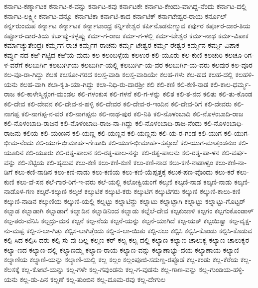 ಕರ್ನಾಟ-ಕರ್ಣ್ನಾಟಕ
ಕರ್ನಾಟ-ಕ-ವನ್ನು
ಕರ್ನಾಟ-ಕವು
ಕರ್ನಾಟಕೇ
ಕರ್ನಾಟ-ಕೇಂದು-ವಾಗಿದ್ದ-ನೆಂದು
ಕರ್ನಾಟ-ದಲ್ಲಿ
ಕರ್ನಾಟ-ಲಕ್ಷ್ಮೀ
ಕರ್ನಾಟ-ವನ್ನೂ
ಕರ್ನಾಟಿಕಾ
ಕರ್ನಾಟಿ-ಕಾದ
ಕರ್ನಾಟಿಕ್
ಕರ್ನಾಟೇಶ್ವರ-ರಾಯ
ಕರ್ನೂಲ್
ಕರ್ನ್ನರುಂಮಪ
ಕರ್ನ್ನಾಟ
ಕರ್ನ್ನಾಟಕ
ಕರ್ನ್ನಾಟಾಂಧ್ರ
ಕರ್ನ್ನಿಕೇಶ್ವರ
ಕರ್ಪಿನೊಡನುಣ್ಮುವ
ಕರ್ಪುರ
ಕರ್ಪೂರ-ದಾರ-ತಿಯ
ಕರ್ಪ್ಪೂರ-ದಾರ-ತಿಯ
ಕರ್ಬಪ್ಪು-ಕಳ್ಬಪ್ಪು
ಕರ್ಮ-ಗ-ರಾಜ
ಕರ್ಮ-ಗ-ಳಲ್ಲಿ
ಕರ್ಮ-ಟೇಶ್ವರ
ಕರ್ಮ-ನಾಥ
ಕರ್ಮ-ವಿಪಾಕ
ಕರ್ಮಾಚ್ಯುತೇಂದ್ರಃ
ಕರ್ಮ್ಮಗ-ರಾಚ
ಕರ್ಮ್ಮಗ-ರಾಚನು
ಕರ್ಮ್ಮ-ಟೇಶ್ವರ
ಕರ್ಮ್ಮ-ಠೇಶ್ವರ
ಕರ್ಮ್ಮನ
ಕರ್ಮ್ಮ-ವಿಪಾಕ
ಕರ್ವ್ವು-ನದ
ಕಱಿ-ಗಟ್ಟಿದ
ಕಱಿಯ-ಮದು
ಕಲ
ಕಲಂಬಳ್ಳೆಯ
ಕಲಉರ-ಕಲಿ-ಯೂರು
ಕಲ-ಕುಣಿ
ಕಲಚುರಿ
ಕಲಚೂ-ರಿಗ-ಳ-ವರೆಗೆ
ಕಲಬುರ್ಗಿ
ಕಲಬುರ್ಗಿಯ
ಕಲಬುರ್ಗಿ-ಯಲ್ಲಿ
ಕಲಬುರ್ಗಿ-ಯ-ವರ
ಕಲಬುರ್ಗಿ-ಯ-ವರು
ಕಲವುರ
ಕಲ-ವೂರ
ಕಲ-ವೂ-ರಾ-ಗಿದ್ದು
ಕಲಶ
ಕಲಸೋ-ಗರದ
ಕಲಸ್ತ-ವಾಡಿ
ಕಲಸ್ತ-ವಾಡಿಯೇ
ಕಲಹ-ಗಳು
ಕಲ-ಹದ
ಕಲಹ-ದಲ್ಲಿ
ಕಲಹಳಿ-ಯನು
ಕಲಹ-ವಾಗಿ
ಕಲಾ-ಕೃತಿ-ಯಾ-ಗಿದ್ದು
ಕಲಾ-ನಿಧಿ-ರು-ದಾರಶ್ರೀ
ಕಲಿ
ಕಲಿ-ಕಣಿ
ಕಲಿ-ಕಣಿ-ನಾಡ
ಕಲಿ-ಕಾಲ-ಧರ್ಮ್ಮ-ರಾಜ
ಕಲಿ-ಕಾಳೇಸ್ಮಿನ್ಗಂಗ-ಮಂಡಲ
ಕಲಿ-ಗಳಂಕುಸ
ಕಲಿ-ಗಳನೆ
ಕಲಿ-ಗ-ಳನ್ನು
ಕಲಿತ
ಕಲಿ-ತ-ನದ
ಕಲಿತು
ಕಲಿ-ತು-ಕೊಂಡ
ಕಲಿ-ದೇವ
ಕಲಿ-ದೇವನ
ಕಲಿ-ದೇವ-ನ-ಹಳ್ಳಿ
ಕಲಿ-ದೇವರ
ಕಲಿ-ದೇವ-ರ-ಇಂದಿನ
ಕಲಿ-ದೇವ-ರಿಗೆ
ಕಲಿ-ದೇವರು
ಕಲಿ-ನಾಗಪ್ಪ
ಕಲಿ-ನಾಗಪ್ಪ-ನ-ವರ
ಕಲಿ-ನಾಗಪ್ಪನು
ಕಲಿ-ನಾಥ-ಪುರ
ಕಲಿ-ನಿತಿ
ಕಲಿ-ನೊಳಂಬಾದಿ
ಕಲಿ-ನೊಳಂಬಾದಿ-ರಾಜ
ಕಲಿ-ನೊಳಂಬಾದಿ-ರಾಜನ
ಕಲಿ-ನೊಳಂಬಾದಿ-ರಾಜ-ನಾ-ಗಿದ್ದು
ಕಲಿ-ನೊಳಂಬಾದಿ-ರಾಜ-ನೆಂದು
ಕಲಿ-ನೊಳಂಬಾಧಿ-ರಾಜನು
ಕಲಿಯ
ಕಲಿ-ಯಂಣನ
ಕಲಿ-ಯಣ್ಣ
ಕಲಿ-ಯಣ್ಣನ
ಕಲಿ-ಯಣ್ಣನು
ಕಲಿ-ಯ-ರ-ಗಂಡ
ಕಲಿ-ಯುಗ
ಕಲಿ-ಯುಗ-ಭೀಮ-ನೆಂದು
ಕಲಿ-ಯುಗ-ಭೀಮಾರ್ಹ-ಗೇಹಾದಿ
ಕಲಿ-ಯುಗ-ಭೀಮಾರ್ಹ-ಸತ್ಫೂಜೆ
ಕಲಿ-ಯುಗ-ಮಾತ್ತಂಡನುಂ
ಕಲಿ-ಯೂರಿನ
ಕಲಿ-ಯೂರು
ಕಲಿ-ರತ್ನ-ಪಾಲನ
ಕಲಿ-ರತ್ನ-ಪಾಲ-ನನ್ನು
ಕಲಿ-ರತ್ನ-ಪಾಲನು
ಕಲಿ-ರತ್ನ-ಪಾ-ಳನ
ಕಲಿ-ವರ್ಷ-ವನ್ನು
ಕಲಿ-ಸೆಟ್ಟಿಯ
ಕಲಿ-ಹೃದುವ
ಕಲು-ಕಣಿ
ಕಲು-ಕಣಿ-ಕುಣಿ
ಕಲು-ಕಣಿ-ನಾಡ
ಕಲು-ಕಣಿ-ನಾಡಾಳ್ವಂ
ಕಲು-ಕಣಿ-ನಾ-ಡಿಗೆ
ಕಲು-ಕಣಿ-ನಾಡಿನ
ಕಲು-ಕಣಿ-ನಾಡು
ಕಲು-ಕಣಿಯ
ಕಲು-ಕಣಿ-ಯೆಪ್ಪತ್ತಕ್ಕೆ
ಕಲುಕ-ಪಣ-ವೊಂದು
ಕಲು-ಕರೆ
ಕಲು-ಕುಣಿ
ಕಲು-ವೆ-ಸನ
ಕಲೆ-ಗಾರ-ರಿಗೆ-ಇ-ವರು
ಕಲೆ-ಯಲ್ಲಿ
ಕಲೋಕ್ವಿಯಂಗೆ
ಕಲ್ಕಣಿ
ಕಲ್ಕಣಿ-ನಾಡ
ಕಲ್ಕಣಿ-ನಾಡು
ಕಲ್ಕಣಿ-ನಾಡೊಳ-ಗಣ
ಕಲ್ಕರೆ-ಕಲ್ಕುಣಿ
ಕಲ್ಕಱೆ
ಕಲ್ಕುಟಿಕ
ಕಲ್ಕುಟಿ-ಕರು
ಕಲ್ಕುಟಿಗ
ಕಲ್ಕುಟಿಗರು
ಕಲ್ಕುಣಿ
ಕಲ್ಕುಣಿ-ಕಾಲು-ಕಣಿ
ಕಲ್ಕುಣಿ-ನಾಡಿನ
ಕಲ್ಕುಣಿಯ
ಕಲ್ಕುಣಿ-ಯಲ್ಲಿ
ಕಲ್ನಟ್ಟು
ಕಲ್ನಾಟಿನ್ದು
ಕಲ್ನಾಟು
ಕಲ್ನಾಟ್ಟಾಗಿ
ಕಲ್ನಾಟ್ಟು
ಕಲ್ನಾಟ್ಟು-ಗೊಟ್ಟರ್
ಕಲ್ನಾಡ
ಕಲ್ನಾಡಾಗಿ
ಕಲ್ನಾಡಾಗೆ
ಕಲ್ನಾಡಿನ
ಕಲ್ನಾಡಿನಿಂದ
ಕಲ್ನಾಡು
ಕಲ್ನೆಲೆ-ದೇವ
ಕಲ್ಪಕುಜಾಳಿ
ಕಲ್ಪಗಂ
ಕಲ್ಪಗಂಕೊಂಡಾಳ್
ಕಲ್ಪ-ತರು-ವೆನಿಸಿ
ಕಲ್ಪದ್ರು-ಮನ
ಕಲ್ಪನೆ
ಕಲ್ಪ-ನೆಯ
ಕಲ್ಪನೆ-ಯನ್ನು
ಕಲ್ಪನೆ-ಯಾಗಿದೆ
ಕಲ್ಪ-ಯತ್
ಕಲ್ಪಯಿತ್ವಾ
ಕಲ್ಪ-ವೃಕ್ಷ-ನು-ಮಪ್ಪ
ಕಲ್ಪಿ-ಸ-ಲಾ-ಗಿತ್ತು
ಕಲ್ಪಿಸ-ಲಾಗಿತ್ತೆಂದು
ಕಲ್ಪಿ-ಸ-ಲಾ-ಯಿತು
ಕಲ್ಪಿ-ಸಲು
ಕಲ್ಪಿಸಿ
ಕಲ್ಪಿಸಿ-ಕೊಂಡು
ಕಲ್ಪಿಸಿ-ಕೊಡುವ
ಕಲ್ಪಿ-ಸಿದ
ಕಲ್ಪಿಸಿ-ದರು
ಕಲ್ಪಿ-ಸು-ವು-ದಿಲ್ಲ
ಕಲ್ಮಣ-ಕರ್
ಕಲ್ಯ
ಕಲ್ಯ-ದಲ್ಲಿ
ಕಲ್ಯಾಣ
ಕಲ್ಯಾಣ-ಚಾಲುಕ್ಯ
ಕಲ್ಯಾಣ-ಚಾಲುಕ್ಯರ
ಕಲ್ಯಾ-ಣದ
ಕಲ್ಯಾಣ-ದಲ್ಲಿ
ಕಲ್ಯಾಣಮ್ಮ
ಕಲ್ಯಾಣ-ರಾಯ
ಕಲ್ಯಾಣ-ವನ್ನು
ಕಲ್ಯಾಣಾಭ್ಯು-ದಯ
ಕಲ್ಯಾಣಾಯ
ಕಲ್ಯಾಣಿ
ಕಲ್ಯಾಣಿಯ
ಕಲ್ಯಾಣಿ-ಯನ್ನು
ಕಲ್ಯಾಣಿ-ಯಲ್ಲಿ
ಕಲ್ಲ
ಕಲ್ಲಂ
ಕಲ್ಲಂಪೂಜಿ-ಸದುಣ್ಡ-ರಪ್ಪೊಡೆ
ಕಲ್ಲ-ಕಂಡು
ಕಲ್ಲ-ಕೆರೆಯ
ಕಲ್ಲ-ಕೆಲಸಕ್ಕೆ
ಕಲ್ಲ-ಕೋಟೆ-ಯನ್ನು
ಕಲ್ಲ-ಗಳೇ
ಕಲ್ಲ-ಗವುಂಡನು
ಕಲ್ಲ-ಗ-ವುಡನು
ಕಲ್ಲ-ಗಾಣ-ವನ್ನು
ಕಲ್ಲ-ಗುಂಡಿಯ-ಹಳ್ಳಿ-ಯನು
ಕಲ್ಲ-ಡು-ಪಿನ
ಕಲ್ಲಣೆ
ಕಲ್ಲ-ತುಂಬಿನ
ಕಲ್ಲ-ದೂಮ-ರವು
ಕಲ್ಲ-ದೇಗುಲ
